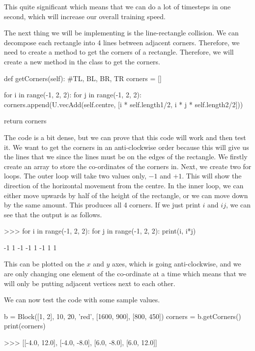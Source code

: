 This quite significant which means that we can do a lot of timesteps in one second, which will increase our overall training speed.

\vs

The next thing we will be implementing is the line-rectangle collision. We can decompose each rectangle into 4 lines between adjacent corners. Therefore, we need to create a method to get the corners of a rectangle. Therefore, we will create a new method in the  class to get the corners.

\vs
\begin{mpy}
    def getCorners(self):
        #TL, BL, BR, TR
        corners = []

        for i in range(-1, 2, 2):
            for j in range(-1, 2, 2):
                corners.append(U.vecAdd(self.centre, [i * self.length1/2, i * j * self.length2/2]))

        return corners
\end{mpy}

\vs
The code is a bit dense, but we can prove that this code will work and then test it. We want to get the corners in an anti-clockwise order because this will give us the lines that we since the lines must be on the edges of the rectangle. We firstly create an array to store the co-ordinates of the corners in. Next, we create two for loops. The outer loop will take two values only, $-1$ and $+1$. This will show the direction of the horizontal movement from the centre. In the inner loop, we can either move upwards by half of the height of the rectangle, or we can move down by the same amount. This produces all 4 corners. If we just print $i$ and $ij$, we can see that the output is as follows.

\begin{mpy}
>>> for i in range(-1, 2, 2):
    for j in range(-1, 2, 2):
        print(i, i*j)

-1 1
-1 -1
1 -1
1 1
\end{mpy}
\vs

This can be plotted on the $x$ and $y$ axes, which is going anti-clockwise, and we are only changing one element of the co-ordinate at a time which means that we will only be putting adjacent vertices next to each other.

\vs
We can now test the code with some sample values.

\begin{mpy}
b = Block([1, 2], 10, 20, 'red', [1600, 900], [800, 450])
corners = b.getCorners()
print(corners)

>>> [[-4.0, 12.0], [-4.0, -8.0], [6.0, -8.0], [6.0, 12.0]]
\end{mpy}

